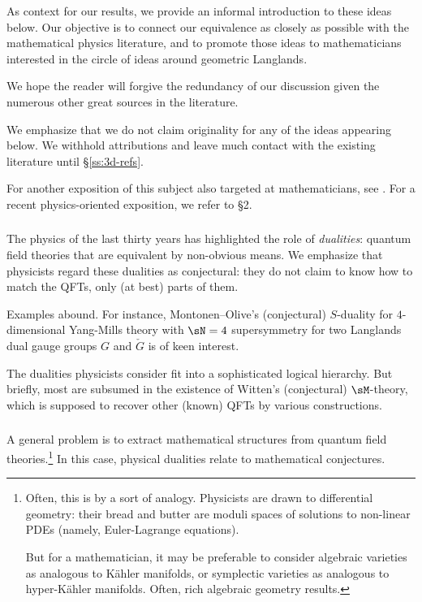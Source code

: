 As context for our results, we
provide an informal introduction to these ideas below.
Our objective is to connect our equivalence as closely as possible with the
mathematical physics literature, and to promote those ideas to mathematicians
interested in the circle of ideas around geometric Langlands.

We hope the reader will forgive the
redundancy of our discussion given
the numerous other great sources in the literature.

We emphasize that we do not claim originality for any of the ideas
appearing below. We withhold attributions and leave much contact
with the existing literature until \S \ref{ss:3d-refs}.

\begin{rem}
\notready

For another exposition of this subject also targeted at mathematicians,
see \cite{bf-notes}. For a recent physics-oriented exposition, we refer
to \cite{dggh} \S 2.

\end{rem}

\subsubsection{}

The physics of the last thirty years has highlighted the role of \emph{dualities}:
quantum field theories that are equivalent by non-obvious means.
We emphasize that
physicists regard these dualities as conjectural: they do not claim
to know how to match the QFTs, only (at best) parts of them.

Examples abound. For instance,
Montonen--Olive's (conjectural) $S$-duality for
$4$-dimensional Yang-Mills theory with $\sN = 4$ supersymmetry for two
Langlands dual gauge groups $G$ and $\check{G}$ is of keen interest.

The dualities physicists consider fit into a sophisticated logical hierarchy.
But briefly, most are subsumed in the existence of Witten's (conjectural) $\sM$-theory,
which is supposed to recover other (known) QFTs by various constructions.

\subsubsection{}

A general problem is to extract mathematical structures
from quantum field theories.\footnote{Often, this is by a sort of analogy. Physicists
are drawn to differential geometry: their bread and butter are moduli spaces
of solutions to non-linear PDEs (namely, Euler-Lagrange equations).

But for a mathematician,
it may be preferable to consider algebraic varieties as analogous to K\"ahler
manifolds, or symplectic varieties as analogous to hyper-K\"ahler manifolds.
Often, rich algebraic geometry results.}
In this case, physical dualities relate to mathematical
conjectures.

